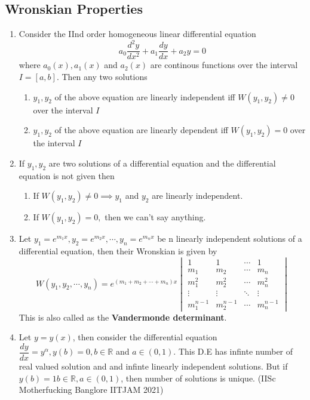 \documentclass[a4paper, titlepage]{article}
\begin{document}
        \subsection{Wronskian Properties}
        \begin{enumerate}
            \item Consider the IInd order homogeneous linear differential 
            equation 
            \[ a_0\dfrac{d^2y}{dx^2} + a_1\dfrac{dy}{dx} + a_2y = 0 \]
            where $a_0(x), a_1(x)$ and $a_2(x)$ are continous functions over the 
            interval $I = [a, b]$. Then any two solutions
            \begin{enumerate}
                \item $y_1, y_2$ of the above equation are linearly 
                independent iff $W(y_1, y_2) \neq 0$ over the interval 
                $I$
                \item $y_1, y_2$ of the above equation are linearly 
                dependent iff $W(y_1, y_2) = 0$ over the interval 
                $I$
            \end{enumerate}
            \item If $y_1, y_2$ are two solutions of a differential 
            equation and the differential equation is not given then
            \begin{enumerate}
                \item If $W(y_1, y_2) \neq 0 \implies y_1$ and $y_2$ are
                linearly independent.
                \item If $W(y_1, y_2) = 0,$ then we can't say anything.
            \end{enumerate}
            \item Let $y_1 = e^{m_1x}, y_2 = e^{m_2x}, \cdots, y_n 
            = e^{m_nx}$ be n linearly independent solutions of a 
            differential equation, then their Wronskian is given by
            \[ 
                W(y_1, y_2, \cdots, y_n) = e^{(m_1 + m_2 + \cdots + m_n)x} 
                \begin{vmatrix}
                    1 & 1 & \cdots & 1\\
                    m_1 & m_2 & \cdots & m_n \\
                    m_1^2 & m_2^2 & \cdots & m_n^2 \\
                    \vdots & \vdots & \ddots &\vdots \\
                    m_1^{n-1} & m_2^{n-1} & \cdots & m_n^{n-1}
                \end{vmatrix}
            \]
            This is also called as the \textbf{Vandermonde determinant}.
            \item Let $y = y(x)$, then consider the differential equation
            $\dfrac{dy}{dx} = y^\alpha, y(b) = 0, b \in \mathbb{R}$ and 
            $a \in (0,1)$. This D.E has infinte number of real valued
            solution and and infinte linearly independent solutions. But
            if $y(b) = 1 b \in \mathbb{R}, a \in (0,1)$, then number of
            solutions is unique. (IISc Motherfucking Banglore IITJAM 2021)
        \end{enumerate}
\end{document}
